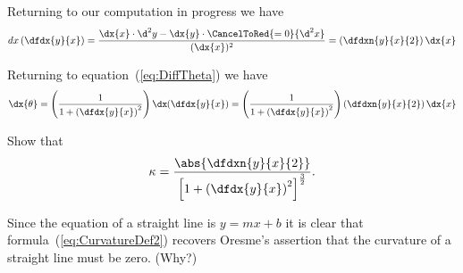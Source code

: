 Returning to our computation in progress we have
$$
dx\left(\dfdx{y}{x}\right) =\frac{\dx{x}\cdot
   \d^2{y}-\dx{y}\cdot\CancelToRed{=0}{\d^2{x}}}{(\dx{x})^2} = \left(\dfdxn{y}{x}{2}\right)\dx{x}%
 $$

  
  Returning to equation~(\ref{eq:DiffTheta}) we have
  $$
  \dx{\theta}=\left(\frac{1}{1+\left(\dfdx{y}{x}\right)^2}\right)\dx\hskip-2pt\left(\dfdx{y}{x}\right)=\left(\frac{1}{1+\left(\dfdx{y}{x}\right)^2}\right)\left(\dfdxn{y}{x}{2}\right)\dx{x}
  $$

\begin{embeddedproblem}
Show that
  \begin{equation}
    \kappa=\frac{\abs{\dfdxn{y}{x}{2}}}{\left[1+\left(\dfdx{y}{x}\right)^2\right]^{\frac32}}.\label{eq:CurvatureDef2}
  \end{equation}
\end{embeddedproblem}

Since the equation of a straight line is $y=mx+b$ it is clear that
formula~(\ref{eq:CurvatureDef2}) recovers Oresme's assertion that the
curvature of a straight line must be zero. (Why?)

